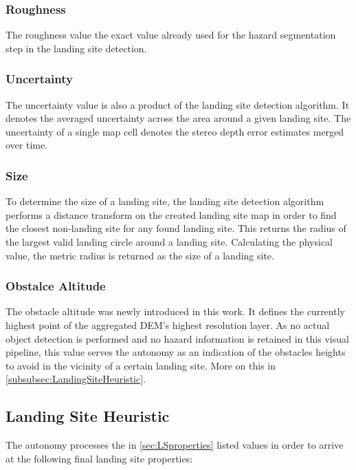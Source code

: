 \subsubsection{Roughness}

The roughness value the exact value already used for the hazard segmentation step in the landing site detection. 

\subsubsection{Uncertainty}

The uncertainty value is also a product of the landing site detection algorithm. It denotes the averaged uncertainty across the area around a given landing site. The uncertainty of a single map cell denotes the stereo depth error estimates merged over time.

\subsubsection{Size}

To determine the size of a landing site, the landing site detection algorithm performs a distance transform on the created landing site map in order to find the closest non-landing site for any found landing site. This returns the radius of the largest valid landing circle around a landing site. Calculating the physical value, the metric radius is returned as the size of a landing site.

\subsubsection{Obstalce Altitude}\label{subsec:obstacle_altitude}

The obstacle altitude was newly introduced in this work. It defines the currently highest point of the aggregated DEM's highest resolution layer. As no actual object detection is performed and no hazard information is retained in this visual pipeline, this value serves the autonomy as an indication of the obstacles heights to avoid in the vicinity of a certain landing site. More on this in \cref{subsubsec:LandingSiteHeuristic}.

\subsection{Landing Site Heuristic}

The autonomy processes the in \cref{sec:LSproperties} listed values in order to arrive at the following final landing site properties:


